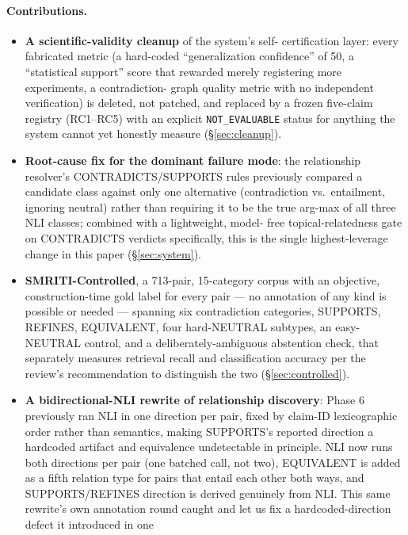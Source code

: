 \documentclass[11pt]{article}
\begin{document}
\paragraph{Contributions.}
\begin{itemize}
  \item \textbf{A scientific-validity cleanup} of the system's self-
    certification layer: every fabricated metric (a hard-coded
    ``generalization confidence'' of 50, a ``statistical support'' score
    that rewarded merely registering more experiments, a contradiction-
    graph quality metric with no independent verification) is deleted, not
    patched, and replaced by a frozen five-claim registry (RC1--RC5) with
    an explicit \texttt{NOT\_EVALUABLE} status for anything the system
    cannot yet honestly measure (\S\ref{sec:cleanup}).
  \item \textbf{Root-cause fix for the dominant failure mode}: the
    relationship resolver's CONTRADICTS/SUPPORTS rules previously compared
    a candidate class against only one alternative (contradiction vs.\
    entailment, ignoring neutral) rather than requiring it to be the true
    arg-max of all three NLI classes; combined with a lightweight, model-
    free topical-relatedness gate on CONTRADICTS verdicts specifically, this
    is the single highest-leverage change in this paper (\S\ref{sec:system}).
  \item \textbf{SMRITI-Controlled}, a 713-pair, 15-category corpus with an
    objective, construction-time gold label for every pair --- no annotation
    of any kind is possible or needed --- spanning six contradiction
    categories, SUPPORTS, REFINES, EQUIVALENT, four hard-NEUTRAL subtypes,
    an easy-NEUTRAL control, and a deliberately-ambiguous abstention check,
    that separately measures retrieval recall and classification accuracy
    per the review's recommendation to distinguish the two
    (\S\ref{sec:controlled}).
  \item \textbf{A bidirectional-NLI rewrite of relationship discovery}:
    Phase 6 previously ran NLI in one direction per pair, fixed by claim-ID
    lexicographic order rather than semantics, making SUPPORTS's reported
    direction a hardcoded artifact and equivalence undetectable in
    principle. NLI now runs both directions per pair (one batched call,
    not two), EQUIVALENT is added as a fifth relation type for pairs that
    entail each other both ways, and SUPPORTS/REFINES direction is derived
    genuinely from NLI. This same rewrite's own annotation round caught
    and let us fix a hardcoded-direction defect it introduced in one

\end{itemize}
\end{document}
